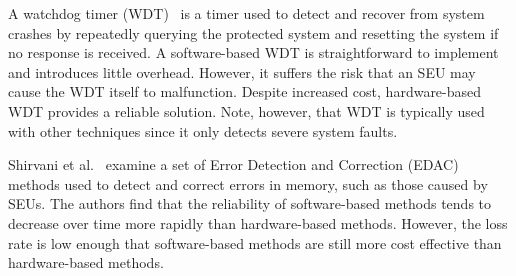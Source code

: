 A watchdog timer (WDT)~\cite{huang1986watchdog} is a timer used to detect and recover from system crashes by repeatedly querying the protected system and resetting the system if no response is received. A software-based WDT is straightforward to implement and introduces little overhead. However, it suffers the risk that an SEU may cause the WDT itself to malfunction. Despite increased cost, hardware-based WDT provides a reliable solution. Note, however, that WDT is typically used with other techniques since it only detects severe system faults.

Shirvani et al.~\cite{Shirvani2001EDAC} examine a set of Error Detection and Correction (EDAC) methods used to detect and correct errors in memory, such as those caused by SEUs. The authors find that the reliability of software-based methods tends to decrease over time more rapidly than hardware-based methods. However, the loss rate is low enough that software-based methods are still more cost effective than hardware-based methods.  
